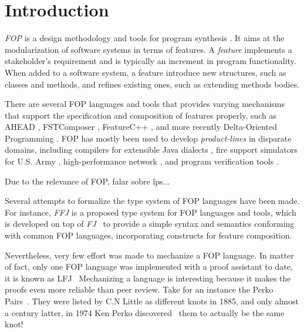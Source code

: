 
\chapter{Introduction}
\textit{\gls{FOP}} \cite{prehofer_feature-oriented_1997} is a design methodology and tools for program synthesis \cite{batory_tutorial_2003}.
It aims at the modularization of software systems in terms of features. A \textit{feature}
implements a stakeholder's requirement and is typically an increment in program functionality.
When added to a software system, a feature introduce new structures, such as classes and methods,
and refines existing ones, such as extending methods bodies.

There are several \gls{FOP} languages and tools that provides varying mechanisms
that support the specification and composition of features properly, such as AHEAD \cite{batory_feature-oriented_2004},
FSTComposer \cite{apel_superimposition:_2008}, FeatureC++ \cite{apel_featurec++:_2005}, and more recently Delta-Oriented Programming \cite{schaefer_delta-oriented_2010}. \gls{FOP} has mostly been used to develop
\textit{product-lines} in disparate domains, including compilers for extensible Java dialects 
\cite{batory_jts:_1998}, fire support simulators for U.S. Army \cite{batory_achieving_2000}, high-performance network
\cite{batory_design_1992}, and program verification tools \cite{kurt_stirewalt_component-based_2001}.

Due to the relevance of \gls{FOP}, falar sobre lps...

Several attempts to formalize the type system of \gls{FOP} languages have been made. %
For instance,  \textit{\gls{FFJ}} \cite{apel_feature_2008} is a proposed type system for \gls{FOP} languages and tools, 
which is developed on top of \textit{\gls{FJ}}~\cite{igarashi_featherweight_2001}
to provide a simple syntax and semantics conforming with common \gls{FOP} languages, 
incorporating constructs for feature composition. %

Nevertheless, very few effort was made to mechanize a \gls{FOP} language. In matter of fact, only one
\gls{FOP} language was implemented with a proof assistant to date, it is known as LFJ~\cite{delaware2009machine}
Mechanizing a language is interesting because it makes the proofs even more reliable than peer review.
Take for an instance the Perko Pairs~\cite{little1900xxx}. 
They were listed by C.N Little as different knots in 1885, and only almost a century latter, 
in 1974 Ken Perko discovered~\cite{rolfsen1976knots} them to actually be the same knot!

